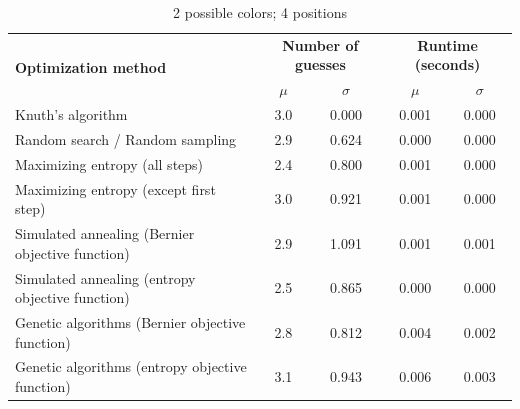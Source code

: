\documentclass[11pt]{article}
\begin{document}
\begin{table}[h!]
\begin{center}
\begin{tabular}{l c c c c}
\toprule
\multirow{2}{*}{\bfseries Optimization method} 		& \multicolumn{2}{c}{\bfseries Number of guesses} 		& \multicolumn{2}{c}{\bfseries Runtime (seconds)}	\\
\cmidrule(lr){2-3}  \cmidrule(lr){4-5}				& $\mu$ & $\sigma$								& $\mu$ & $\sigma$							\\
\cmidrule(lr){1-5}
Knuth's algorithm							& 3.0 & 0.000									& 0.001 & 	0.000							\\
Random search / Random sampling				& 2.9 & 0.624									& 0.000 & 0.000 							\\
Maximizing entropy (all steps)					& 2.4 & 0.800									& 0.001 & 0.000 							\\
Maximizing entropy (except first step)			& 3.0 & 0.921									& 0.001 & 0.000 							\\
Simulated annealing (Bernier objective function)	& 2.9 & 1.091									& 0.001 & 0.001 							\\
Simulated annealing (entropy objective function)	& 2.5 & 0.865									& 0.000 & 0.000 							\\
Genetic algorithms (Bernier objective function)		& 2.8 & 0.812									& 0.004 & 0.002 							\\
Genetic algorithms (entropy objective function)		& 3.1 & 0.943									& 0.006 & 0.003							\\
\bottomrule
\end{tabular}
\end{center}
\caption{2 possible colors; 4 positions}
\label{fig:compare_2_4}
\end{table}
\end{document}
